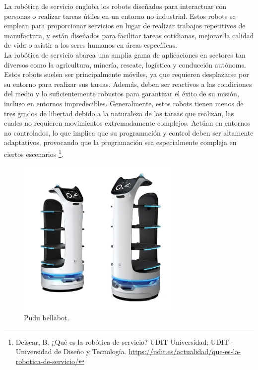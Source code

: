 La robótica de servicio engloba los robots diseñados para interactuar con personas o realizar tareas útiles en un entorno no industrial. Estos robots se emplean para proporcionar servicios en lugar de realizar trabajos repetitivos de manufactura, y están diseñados para facilitar tareas cotidianas, mejorar la calidad de vida o asistir a los seres humanos en áreas específicas. \\

La robótica de servicio abarca una amplia gama de aplicaciones en sectores tan diversos como la agricultura, minería, rescate, logística y conducción autónoma. Estos robots suelen ser principalmente móviles, ya que requieren desplazarse por su entorno para realizar sus tareas. Además, deben ser reactivos a las condiciones del medio y lo suficientemente robustos para garantizar el éxito de su misión, incluso en entornos impredecibles. Generalmente, estos robots tienen menos de tres grados de libertad debido a la naturaleza de las tareas que realizan, las cuales no requieren movimientos extremadamente complejos. Actúan en entornos no controlados, lo que implica que su programación y control deben ser altamente adaptativos, provocando que la programación sea especialmente compleja en ciertos escenarios \footnote{Deiscar, B. ¿Qué es la robótica de servicio? UDIT Universidad; UDIT - Universidad de Diseño y Tecnología. \url{https://udit.es/actualidad/que-es-la-robotica-de-servicio/}}. 

\begin{figure} [h!]
  \begin{center}
    \includegraphics[width=8cm]{figs/robotica_servicio}
  \end{center}
  \caption{\centering Pudu bellabot.}
  \label{fig:robotica_servicio}
\end{figure}

